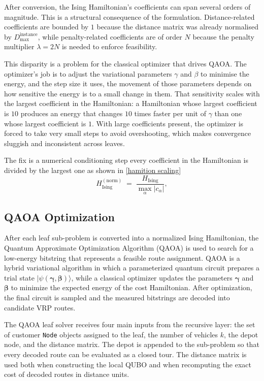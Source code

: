 \documentclass[a4paper]{report}
\begin{document}
{\begin{itemize}
\begin{itemize}
After conversion, the Ising Hamiltonian's coefficients can span
several orders of magnitude. This is a structural consequence of the
formulation. Distance-related coefficients are bounded by $1$ because
the distance matrix was already normalised by $D_{\max}^{\text{instance}}$,
while penalty-related coefficients are of order $N$ because the
penalty multiplier $\lambda = 2N$ is needed to enforce feasibility.

This disparity is a problem for the classical optimizer that drives
QAOA. The optimizer's job is to adjust the variational parameters
$\gamma$ and $\beta$ to minimise the energy, and the step size it
uses, the movement of those parameters depends on how sensitive the energy
is to a small change in them. That sensitivity scales with the
largest coefficient in the Hamiltonian: a Hamiltonian whose largest
coefficient is $10$ produces an energy that changes $10$ times faster
per unit of $\gamma$ than one whose largest coefficient is $1$. With
large coefficients present, the optimizer is forced to take very
small steps to avoid overshooting, which makes convergence sluggish
and inconsistent across leaves\cite{azfar2025quantum}.

The fix is a numerical conditioning step  every coefficient
in the Hamiltonian is divided by the largest one as shown in \ref{hamition scaling}
\begin{equation}
H_{\text{Ising}}^{(\text{norm})}
\;=\;
\frac{H_{\text{Ising}}}{\max_{\alpha} |c_{\alpha}|},
\label{hamition scaling}
\end{equation}
\subsection{QAOA Optimization}
\label{sec:qaoa-optimization}

After each leaf sub-problem is converted into a normalized Ising
Hamiltonian, the Quantum Approximate Optimization Algorithm (QAOA) is
used to search for a low-energy bitstring that represents a feasible
route assignment. QAOA is a hybrid variational algorithm in which a
parameterized quantum circuit prepares a trial state
$|\psi(\boldsymbol{\gamma},\boldsymbol{\beta})\rangle$, while a
classical optimizer updates the parameters
$\boldsymbol{\gamma}$ and $\boldsymbol{\beta}$ to minimize the expected
energy of the cost Hamiltonian. After optimization, the final circuit is
sampled and the measured bitstrings are decoded into candidate VRP
routes.

The QAOA leaf solver receives four main inputs from the recursive layer:
the set of customer \texttt{Node} objects assigned to the leaf, the
 number of vehicles $k$, the depot node, and the
distance matrix. The depot is appended to the sub-problem
so that every decoded route can be evaluated as a closed tour. The
distance matrix is used both when constructing the local QUBO and when
recomputing the exact cost of decoded routes in distance units.


\end{itemize}
\end{itemize}}
\end{document}
